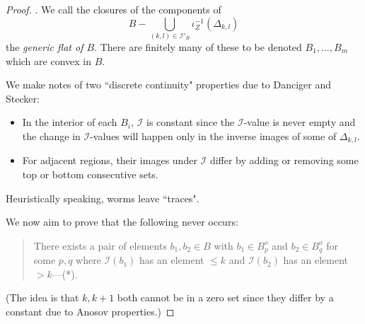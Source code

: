 \begin{proof}

. 
	We call the closures of the components of 
	\[B - \bigcup_{(k, l)\in \mathcal{I}'_B} \iota_Z^{-1}(\Delta_{k, l}) \] %
	the {\em generic flat  of $B$}.  
	There are finitely many of these 
	to be denoted $B_1, \dots, B_m$ which are convex 
	 in $B$.  
	

We make notes of two ``discrete continuity" properties due to Danciger and Stecker: 
\begin{itemize} 
\item	In the interior of each $B_i$, $\mathcal{I}$ is constant since the 
$\mathcal{I}$-value is never empty and the change  in $\mathcal{I}$-values 
will happen only in the inverse images of some of $\Delta_{k,l}$. 
	
	
\item	For adjacent regions, their images under $\mathcal{I}$ differ by
	adding or removing some top or bottom consecutive sets. 
\end{itemize} 
Heuristically speaking, worms leave ``traces".
	
	We now aim to prove that the following never occurs: 
	\begin{quotation} 
	There exists a pair of elements $b_1, b_2 \in B$
	with $b_1 \in B_p^o$ and $b_2 \in B_q^o$ for some $p, q$
	where $\mathcal{I}(b_1)$ has an element $\leq k$ and 
	$\mathcal{I}(b_2)$ has an element $> k$---(*).
	\end{quotation} 
(The idea is that $k, k+1$ both cannot be in a zero set since they differ by a constant due to Anosov properties.)


\end{proof}
